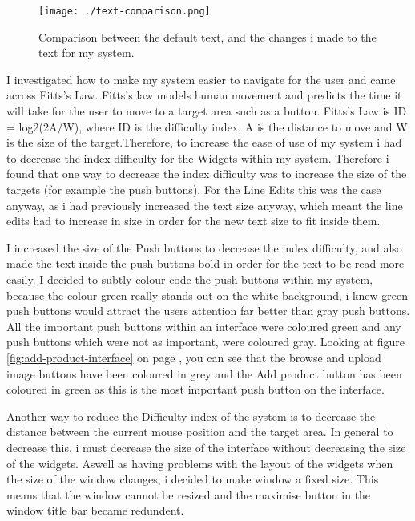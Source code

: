 \begin{figure}[H]
    \texttt{[image: ./text-comparison.png]}
    \caption{Comparison between the default text, and the changes i made to the text for my system.} \label{fig:text-comparison}
\end{figure}

I investigated how to make my system easier to navigate for the user and came across Fitts's Law. Fitts's law models human movement and predicts the time it will take for the user to move to a target area such as a button. Fitts's Law is ID = log2(2A/W), where ID is the difficulty index, A is the distance to move and W is the size of the target.Therefore, to increase the ease of use of my system i had to decrease the index difficulty for the Widgets within my system. Therefore i found that one way to decrease the index difficulty was to increase the size of the targets (for example the push buttons). For the Line Edits this was the case anyway, as i had previously increased the text size anyway, which meant the line edits had to increase in size in order for the new text size to fit inside them.\par

I increased the size of the Push buttons to decrease the index difficulty, and also made the text inside the push buttons bold in order for the text to be read more easily. I decided to subtly colour code the push buttons within my system, because the colour green really stands out on the white background, i knew green push buttons would attract the users attention far better than gray push buttons. All the important push buttons within an interface were coloured green and any push buttons which were not as important, were coloured gray. Looking at figure \ref{fig:add-product-interface} on page \pageref{fig:add-product-interface}, you can see that the browse and upload image buttons have been coloured in grey and the Add product button has been coloured in green as this is the most important push button on the interface. \par

Another way to reduce the Difficulty index of the system is to decrease the distance between the current mouse position and the target area. In general to decrease this, i must decrease the size of the interface without decreasing the size of the widgets. Aswell as having problems with the layout of the widgets when the size of the window changes, i decided to make window a fixed size. This means that the window cannot be resized and the maximise button in the window title bar became redundent.

